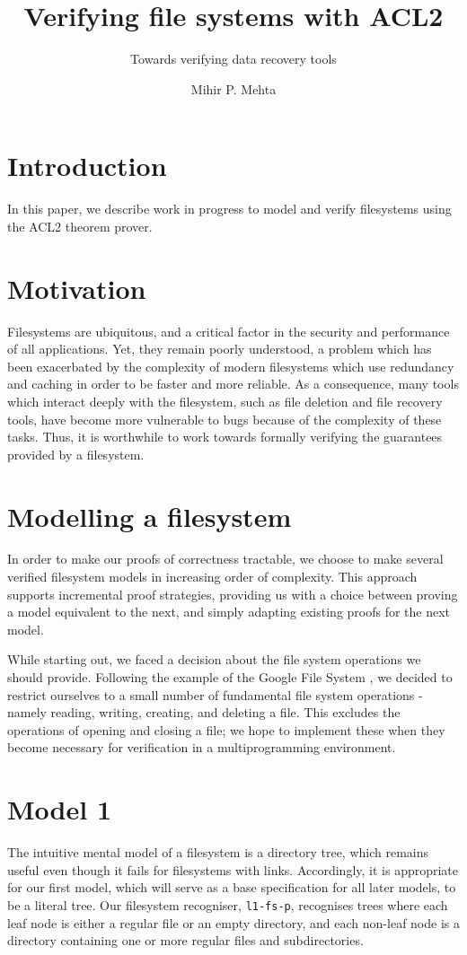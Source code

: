 \documentclass[format=sigconf,review=true]{acmart}
\title{Verifying file systems with ACL2}
\subtitle{Towards verifying data recovery tools}
\author{Mihir P. Mehta}
\affiliation{%
  \institution{University of Texas at Austin}
  \city{Austin}
  \state{TX}
  \country{USA}}
\begin{document}
\lstset{language=Lisp}

\maketitle

\section{Introduction}

In this paper, we describe work in progress to model and verify
filesystems using the ACL2 theorem prover.

\section{Motivation}
Filesystems are ubiquitous, and a critical factor in the security and
performance of all applications. Yet, they remain poorly understood,
a problem which has been exacerbated by the complexity of modern
filesystems which use redundancy and caching in order to be faster and
more reliable. As a consequence, many tools which interact deeply with
the filesystem, such as file deletion and file recovery tools, have
become more vulnerable to bugs because of the complexity of these
tasks. Thus, it is worthwhile to work towards formally verifying the
guarantees provided by a filesystem.

\section{Modelling a filesystem}

In order to make our proofs of correctness tractable, we choose to
make several verified filesystem models in increasing order of
complexity. This approach supports incremental proof strategies,
providing us with a choice between proving a model equivalent to the
next, and simply adapting existing proofs for the next model.

While starting out, we faced a decision about the file system
operations we should provide. Following the  example of the Google
File System \cite{Ghemawat:2003:GFS:945445.945450}, we decided to
restrict ourselves to a small number of fundamental file system
operations - namely reading, writing, creating, and deleting a
file. This excludes the operations of opening and closing a file; we
hope to implement these when they become necessary for verification in
a multiprogramming environment.

\section{Model 1}
The intuitive mental model of a filesystem is a directory tree, which
remains useful even though it fails for filesystems with
links. Accordingly, it is appropriate for our first model, which will
serve as a base specification for all later models, to be a literal
tree. Our filesystem recogniser, \texttt{l1-fs-p}, recognises trees
where each leaf node is either a regular file or an empty directory,
and each non-leaf node is a directory containing one or more regular
files and subdirectories.
\end{document}
